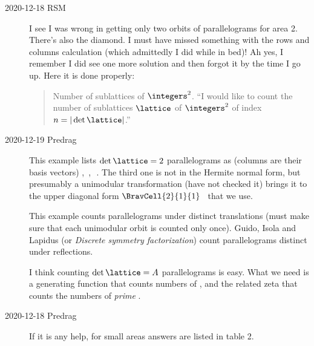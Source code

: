 \begin{description}
\item[2020-12-18 RSM]
I see I was wrong in getting only two orbits of parallelograms for area
2.  There's also the diamond.  I must have missed something with the rows
and columns calculation (which admittedly I did while in bed)!  Ah yes, I
remember I did see one more solution and then forgot it by the time I go
up. {Here it is done properly}:

\begin{quote}
{Number of sublattices of $\integers^2$}. ``I would like to count the
number of sublattices $\lattice$  of $\integers^2$ of index
$n=|\det\lattice|$.''
\end{quote}

\item[2020-12-19 Predrag] This example lists $\det\lattice=2$ parallelograms
as (columns
are their basis vectors)
\beq
\left[
\begin{array}{cc}
 2 & 0 \\
 0 & 1 \\
\end{array}
\right]
,\,
\left[
\begin{array}{cc}
 0 & 1 \\
 2 & 0 \\
\end{array}
\right]
,\,
\left[
\begin{array}{cc}
 1 & -1 \\
 1 &  1 \\
\end{array}
\right]
\,.
The third one is not in the Hermite normal form, but presumably a unimodular
transformation (have not checked it) brings it to the upper diagonal
form $\BravCell{2}{1}{1}$ \twot\ that we use.

This example counts
parallelograms under distinct translations (must make sure that each unimodular
orbit is counted only once).
Guido, Isola and Lapidus (or
 \emph{Discrete symmetry
factorization}) count parallelograms distinct under reflections.

I think counting $\det\lattice=A$ parallelograms is easy.
What we need is a generating function that counts numbers of \twots, and
the related zeta that counts the numbers of \emph{prime} \twots.

\item[2020-12-18 Predrag]
If it is any help, for small areas answers are listed in
{table 2}.


\end{description}
